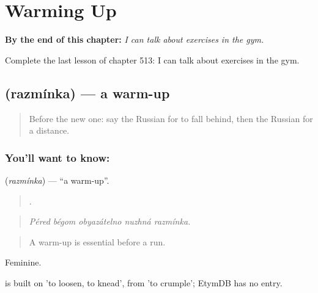 
\chapter{Warming Up}
\label{ch:ru-warming-up}

\begin{chapteropening}
\textbf{By the end of this chapter:} \emph{I can talk about exercises in the gym.}

Complete the last lesson of chapter 513: I can talk about exercises in the gym.
\end{chapteropening}

\section[\texorpdfstring{\ru{разминка} (razmínka)}{разминка (razmínka)}]{ (razmínka) — a warm-up}

\label{lesson:RU-C513-razminka}



\begin{quote}
Before the new one: say the Russian for to fall behind, then the Russian for a distance.
\end{quote}

\subsection*{You'll want to know: }
\textbf{} (\emph{razmínka}) — \textquotedblleft{}a warm-up\textquotedblright{}.

\begin{quote}
    .
\end{quote}

\begin{quote}
\emph{Péred bégom obyazátelno nuzhná razmínka.}
\end{quote}

\begin{quote}
A warm-up is essential before a run.
\end{quote}

Feminine.

\begin{cousinweb}
\emph{} is built on \emph{} 'to loosen, to knead', from \emph{} 'to crumple'; EtymDB has no entry.
\end{cousinweb}

